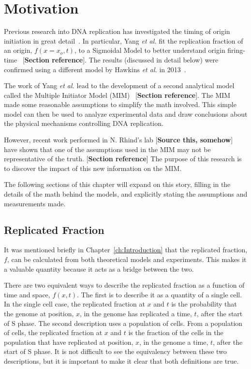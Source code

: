 \chapter{Motivation}
\label{ch:Motivation}

Previous research into DNA replication has investigated the timing of origin initiation in great detail~\cite{ScottsPaper,StochasticTermination,Bechhoefer2012374,deMouraModel1,deMouraModel2}.
In particular, Yang \emph{et al.} fit the replication fraction of an origin, $f(x=x_o,t)$, to a Sigmoidal Model to better understand origin firing-time~\cite{ScottsPaper} [\textbf{Section reference}].
The results (discussed in detail below) were confirmed using a different model by Hawkins \emph{et al.} in 2013~\cite{StochasticTermination}.

The work of Yang \emph{et al.} lead to the development of a second analytical model called the Multiple Initiator Model (MIM)~\cite{ScottsPaper} [\textbf{Section reference}].
The MIM made some reasonable assumptions to simplify the math involved.
This simple model can then be used to analyze experimental data and draw conclusions about the physical mechanisms controlling DNA replication.

However, recent work performed in N. Rhind's lab [\textbf{Source this, somehow}] have shown that one of the assumptions used in the MIM may not be representative of the truth. [\textbf{Section reference}]
The purpose of this research is to discover the impact of this new information on the MIM.

The following sections of this chapter will expand on this story, filling in the details of the math behind the models, and explicitly stating the assumptions and measurements made.


	\section{Replicated Fraction}
	\label{sec:ReplicatedFraction}
	
	It was mentioned briefly in Chapter~\ref{ch:Introduction} that the replicated fraction, $f$, can be calculated from both theoretical models and experiments.
	This makes it a valuable quantity because it acts as a bridge between the two.
	
	There are two equivalent ways to describe the replicated fraction as a function of time and space, $f(x,t)$.
	The first is to describe it as a quantity of a single cell.
	In the single cell case, the replicated fraction at $x$ and $t$ is the probability that the genome at position, $x$, in the genome has replicated a time, $t$, after the start of S phase.
	The second description uses a population of cells.
	From a population of cells, the replicated fraction at $x$ and $t$ is the fraction of the cells in the population that have replicated at position, $x$, in the genome a time, $t$, after the start of S phase.
	It is not difficult to see the equivalency between these two descriptions, but it is important to make it clear that both definitions are true.
	
